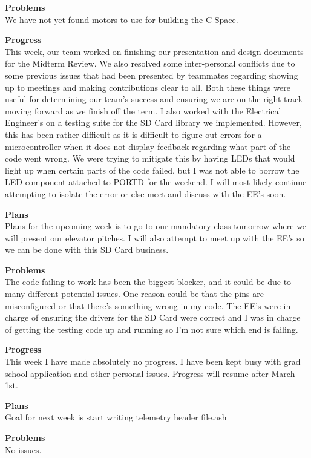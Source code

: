 \textbf{Problems} \\ 
We have not yet found motors to use for building the C-Space.

\textbf{Progress} \\ 
This week, our team worked on finishing our presentation and design documents for the Midterm Review. We also resolved some inter-personal conflicts due 
to some previous issues that had been presented by teammates regarding showing up to meetings and making contributions clear to all. Both these things 
were useful for determining our team's success and ensuring we are on the right track moving forward as we finish off the term. I also worked with the 
Electrical Engineer's on a testing suite for the SD Card library we implemented. However, this has been rather difficult as it is difficult to figure out 
errors for a microcontroller when it does not display feedback regarding what part of the code went wrong. We were trying to mitigate this by having LEDs 
that would light up when certain parts of the code failed, but I was not able to borrow the LED component attached to PORTD for the weekend. I will most 
likely continue attempting to isolate the error or else meet and discuss with the EE's soon.

\textbf{Plans} \\ 
Plans for the upcoming week is to go to our mandatory class tomorrow where we will present our elevator pitches. I will also attempt to meet up with the 
EE's so we can be done with this SD Card business.

\textbf{Problems} \\ 
The code failing to work has been the biggest blocker, and it could be due to many different potential issues. One reason could be that the pins are 
misconfigured or that there's something wrong in my code. The EE's were in charge of ensuring the drivers for the SD Card were correct and I was in 
charge of getting the testing code up and running so I'm not sure which end is failing.

\textbf{Progress} \\
This week I have made absolutely no progress. I have been kept busy with grad 
school application and other personal issues. Progress will resume after March
1st.

\textbf{Plans} \\
Goal for next week is start writing telemetry header file.ash

\textbf{Problems} \\
No issues.

